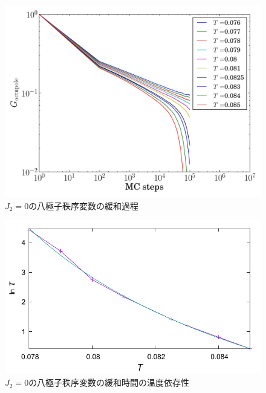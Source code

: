 \documentclass[12pt,titlepage,dvipdfmx]{jarticle}
\begin{document}


\begin{figure}[H]
   \centering
   \includegraphics[width=12cm]{figure/octupole_raw_data_j2_0.pdf}
   \caption{$J_2=0$の八極子秩序変数の緩和過程}
\end{figure}

\begin{figure}[H]
   \centering
   \includegraphics[width=12cm]{figure/octupole_Tc_j2_0.pdf}
   \caption{$J_2=0$の八極子秩序変数の緩和時間の温度依存性}
\end{figure}
\end{document}
